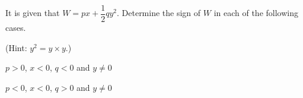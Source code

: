 It is given that $W = px + \dfrac{1}{2}qy^2$. Determine the sign of $W$ in each of the following cases.

(Hint: $y^2 = y \times y$.)

\begin{subparts}
  \item $p>0$, $x<0$, $q<0$ and $y \neq 0$
  \item $p<0$, $x<0$, $q>0$ and $y \neq 0$
\end{subparts}

